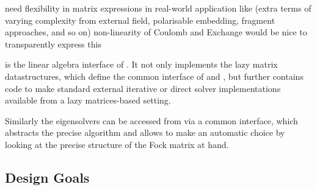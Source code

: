 need flexibility in matrix expressions in real-world application
like \SCF (extra terms of varying complexity from external field,
polarisable embedding, fragment approaches, and so on)
non-linearity of Coulomb and Exchange
would be nice to transparently express this


\lazyten is the linear algebra interface of \molsturm.
It not only implements the lazy matrix datastructures,
which define the common interface of \gint and \gscf,
but further contains code to make standard external
iterative or direct solver implementations available
from a lazy matrices-based setting.

Similarly the eigensolvers can be accessed from \gscf via a common interface,
which abstracts the precise algorithm and allows \lazyten to make an automatic
choice by looking at the precise structure of the Fock matrix at hand.





\subsection{Design Goals}
\label{sec:design-goals}





